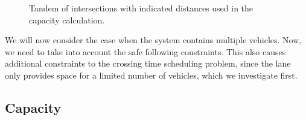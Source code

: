 \documentclass[a4paper]{article}
\theoremstyle{definition}
\theoremstyle{plain}
\begin{document}
\begin{figure}
  \centering
  \caption{Tandem of intersections with indicated distances used in the capacity
    calculation.}
  \label{fig:tandem_annotated}
\end{figure}


We will now consider the case when the system contains multiple vehicles. Now,
we need to take into account the safe following constraints. This also causes
additional constraints to the crossing time scheduling problem, since the lane
only provides space for a limited number of vehicles, which we investigate
first.

\subsection*{Capacity}
\end{document}
